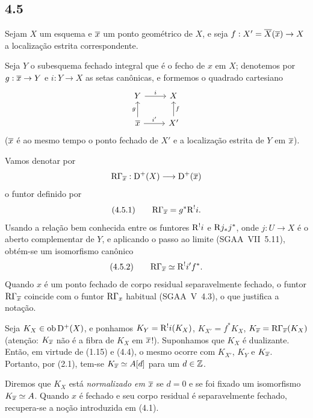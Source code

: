 \subsection*{4.5}
Sejam $X$ um esquema e $\overline{x}$ um ponto geométrico de $X$, e seja $f:X'=\overline{X}(\overline{x})\to X$ a localização estrita correspondente.

Seja $Y$ o subesquema fechado integral que é o fecho de $x$ em $X$; denotemos por $g:\overline{x}\to Y$ e $i:Y\to X$ as setas canônicas, e formemos o quadrado cartesiano
\[
\begin{tikzcd}
Y \arrow[r,"i"] & X \\
\ol{x} \arrow[u,"g"] \arrow[r,"i'"] & X' \arrow[u,"f"']
\end{tikzcd}
\]
($\overline{x}$ é ao mesmo tempo o ponto fechado de $X'$ e a localização estrita de $Y$ em $\overline{x}$).

Vamos denotar por
\[
\mathrm{R}\Gamma_{\overline{x}}:\mathrm{D}^+(X)\longrightarrow \mathrm{D}^+(\overline{x})
\]
o funtor definido por
\[
(4.5.1)\qquad \mathrm{R}\Gamma_{\overline{x}}=g^*\mathrm{R}^{!}i.
\]
Usando a relação bem conhecida entre os funtores $\mathrm{R}^{!}i$ e $\mathrm{R} j_*j^*$, onde $j:U\to X$ é o aberto complementar de $Y$, e aplicando o passo ao limite (SGAA~VII~5.11), obtém-se um isomorfismo canônico
\[
(4.5.2)\qquad \mathrm{R}\Gamma_{\overline{x}}\simeq\mathrm{R}^{!}i' f^*.
\]
Quando $x$ é um ponto fechado de corpo residual separavelmente fechado, o funtor $\mathrm{R}\Gamma_{\overline{x}}$ coincide com o funtor $\mathrm{R}\Gamma_x$ habitual (SGAA~V~4.3), o que justifica a notação.

Seja $K_X\in\operatorname{ob}\mathrm{D}^+(X)$, e ponhamos $K_Y=\mathrm{R}^{!}i(K_X)$, $K_{X'}=f^*K_X$, $K_{\overline{x}}=\mathrm{R}\Gamma_{\overline{x}}(K_X)$ (atenção: $K_{\overline{x}}$ não é a fibra de $K_X$ em $\overline{x}$!). Suponhamos que $K_X$ é dualizante. Então, em virtude de (1.15) e (4.4), o mesmo ocorre com $K_{X'}$, $K_Y$ e $K_{\overline{x}}$. Portanto, por (2.1), tem-se $K_{\overline{x}}\simeq A[d]$ para um $d\in\mathbb{Z}$.

Diremos que $K_X$ está \emph{normalizado em $\overline{x}$} se $d=0$ e se foi fixado um isomorfismo $K_{\overline{x}}\simeq A$. Quando $x$ é fechado e seu corpo residual é separavelmente fechado, recupera-se a noção introduzida em (4.1).

